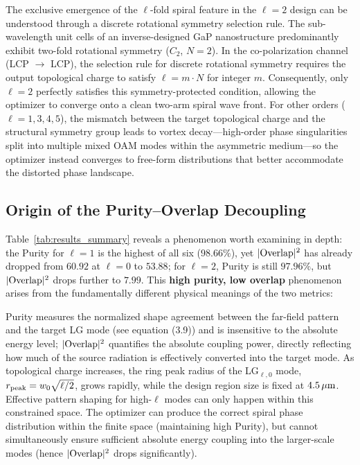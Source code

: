 The exclusive emergence of the $\ell$-fold spiral feature in the $\ell = 2$ design can be understood through a discrete rotational symmetry selection rule. The sub-wavelength unit cells of an inverse-designed GaP nanostructure predominantly exhibit two-fold rotational symmetry ($C_2$, $N = 2$). In the co-polarization channel (LCP $\rightarrow$ LCP), the selection rule for discrete rotational symmetry requires the output topological charge to satisfy $\ell = m \cdot N$ for integer $m$. Consequently, only $\ell = 2$ perfectly satisfies this symmetry-protected condition, allowing the optimizer to converge onto a clean two-arm spiral wave front. For other orders ($\ell = 1, 3, 4, 5$), the mismatch between the target topological charge and the structural symmetry group leads to vortex decay---high-order phase singularities split into multiple mixed OAM modes within the asymmetric medium---so the optimizer instead converges to free-form distributions that better accommodate the distorted phase landscape.


\subsection{Origin of the Purity--Overlap Decoupling}

\label{ssec:purity_overlap}

Table~\ref{tab:results_summary} reveals a phenomenon worth examining in depth: the Purity for $\ell = 1$ is the highest of all six ($98.66\%$), yet $|{\rm Overlap}|^2$ has already dropped from $60.92$ at $\ell=0$ to $53.88$; for $\ell = 2$, Purity is still $97.96\%$, but $|{\rm Overlap}|^2$ drops further to $7.99$. This \textbf{high purity, low overlap} phenomenon arises from the fundamentally different physical meanings of the two metrics:

Purity measures the normalized shape agreement between the far-field pattern and the target LG mode (see equation (3.9)) and is insensitive to the absolute energy level; $|{\rm Overlap}|^2$ quantifies the absolute coupling power, directly reflecting how much of the source radiation is effectively converted into the target mode. As topological charge increases, the ring peak radius of the LG$_{\ell,0}$ mode, $r_{\rm peak} = w_0\sqrt{\ell/2}$, grows rapidly, while the design region size is fixed at $4.5\,\mu{\rm m}$. Effective pattern shaping for high-$\ell$ modes can only happen within this constrained space. The optimizer can produce the correct spiral phase distribution within the finite space (maintaining high Purity), but cannot simultaneously ensure sufficient absolute energy coupling into the larger-scale modes (hence $|{\rm Overlap}|^2$ drops significantly).

